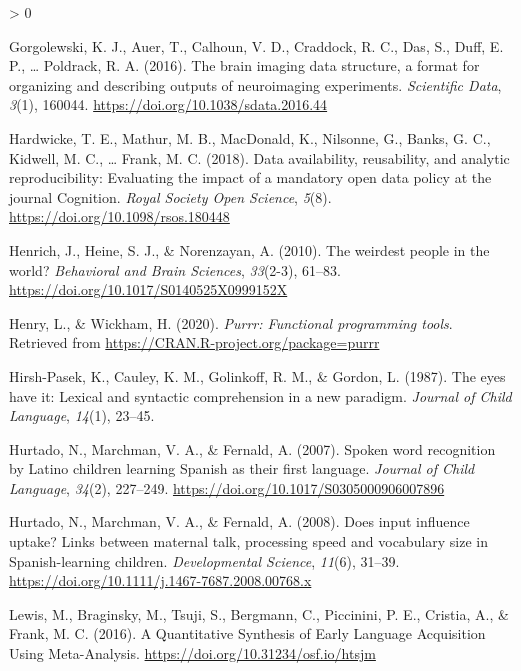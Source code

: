 \documentclass[
  english,
  man,floatsintext]{apa6}
\newlength{\cslhangindent}
\newenvironment{CSLReferences}[2] %
 {%
  \setlength{\parindent}{0pt}
  \ifodd #1 \everypar{\setlength{\hangindent}{\cslhangindent}}\ignorespaces\fi
  \ifnum #2 > 0
  \setlength{\parskip}{#2\baselineskip}
  \fi
 }%
 {}
\begin{document}
\begin{CSLReferences}{1}{0}
\leavevmode\hypertarget{ref-gorgolewski_brain_2016}{}%
Gorgolewski, K. J., Auer, T., Calhoun, V. D., Craddock, R. C., Das, S., Duff, E. P., \ldots{} Poldrack, R. A. (2016). The brain imaging data structure, a format for organizing and describing outputs of neuroimaging experiments. \emph{Scientific Data}, \emph{3}(1), 160044. \url{https://doi.org/10.1038/sdata.2016.44}

\leavevmode\hypertarget{ref-hardwicke2018}{}%
Hardwicke, T. E., Mathur, M. B., MacDonald, K., Nilsonne, G., Banks, G. C., Kidwell, M. C., \ldots{} Frank, M. C. (2018). {Data availability, reusability, and analytic reproducibility: Evaluating the impact of a mandatory open data policy at the journal Cognition}. \emph{Royal Society Open Science}, \emph{5}(8). \url{https://doi.org/10.1098/rsos.180448}

\leavevmode\hypertarget{ref-Henrich2010}{}%
Henrich, J., Heine, S. J., \& Norenzayan, A. (2010). {The weirdest people in the world?} \emph{Behavioral and Brain Sciences}, \emph{33}(2-3), 61--83. \url{https://doi.org/10.1017/S0140525X0999152X}

\leavevmode\hypertarget{ref-R-purrr}{}%
Henry, L., \& Wickham, H. (2020). \emph{Purrr: Functional programming tools}. Retrieved from \url{https://CRAN.R-project.org/package=purrr}

\leavevmode\hypertarget{ref-hirshpasek1987}{}%
Hirsh-Pasek, K., Cauley, K. M., Golinkoff, R. M., \& Gordon, L. (1987). {The eyes have it: Lexical and syntactic comprehension in a new paradigm}. \emph{Journal of Child Language}, \emph{14}(1), 23--45.

\leavevmode\hypertarget{ref-Hurtado2007}{}%
Hurtado, N., Marchman, V. A., \& Fernald, A. (2007). {Spoken word recognition by Latino children learning Spanish as their first language}. \emph{Journal of Child Language}, \emph{34}(2), 227--249. \url{https://doi.org/10.1017/S0305000906007896}

\leavevmode\hypertarget{ref-Hurtado2008}{}%
Hurtado, N., Marchman, V. A., \& Fernald, A. (2008). {Does input influence uptake? Links between maternal talk, processing speed and vocabulary size in Spanish-learning children}. \emph{Developmental Science}, \emph{11}(6), 31--39. \url{https://doi.org/10.1111/j.1467-7687.2008.00768.x}

\leavevmode\hypertarget{ref-Lewis2016}{}%
Lewis, M., Braginsky, M., Tsuji, S., Bergmann, C., Piccinini, P. E., Cristia, A., \& Frank, M. C. (2016). {A Quantitative Synthesis of Early Language Acquisition Using Meta-Analysis}. \url{https://doi.org/10.31234/osf.io/htsjm}


\end{CSLReferences}
\end{document}
